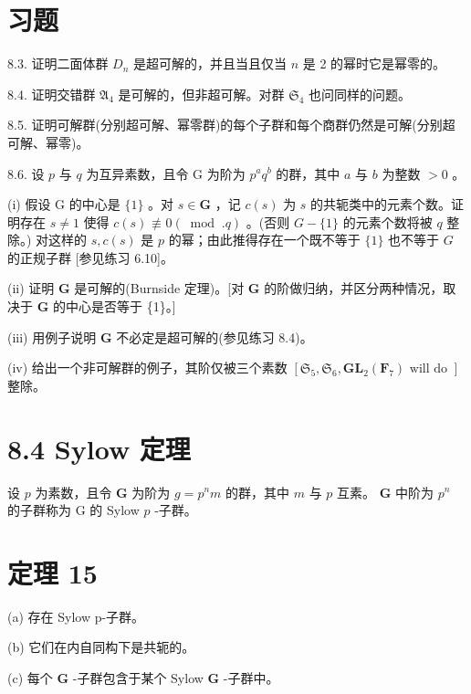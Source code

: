 \documentclass[10pt]{article}
\begin{document}
\section*{习题}

8.3. 证明二面体群 \({D}_{n}\) 是超可解的，并且当且仅当 \(n\) 是 2 的幂时它是幂零的。

8.4. 证明交错群 \({\mathfrak{A}}_{4}\) 是可解的，但非超可解。对群 \({\mathfrak{S}}_{4}\) 也问同样的问题。

8.5. 证明可解群(分别超可解、幂零群)的每个子群和每个商群仍然是可解(分别超可解、幂零)。

8.6. 设 \(p\) 与 \(q\) 为互异素数，且令 \(\mathrm{G}\) 为阶为 \({p}^{a}{q}^{b}\) 的群，其中 \(a\) 与 \(b\) 为整数 \(> 0\) 。

(i) 假设 \(\mathrm{G}\) 的中心是 \(\{ 1\}\) 。对 \(s \in  \mathbf{G}\) ，记 \(c\left( s\right)\) 为 \(s\) 的共轭类中的元素个数。证明存在 \(s \neq  1\) 使得 \(c\left( s\right)  \text{ ≢ } 0\left( {{\;\operatorname{mod}\;.}q}\right)\) 。(否则 \(G - \{ 1\}\) 的元素个数将被 \(q\) 整除。) 对这样的 \(s,c\left( s\right)\) 是 \(p\) 的幂；由此推得存在一个既不等于 \(\{ 1\}\) 也不等于 \(G\) 的正规子群 [参见练习 6.10]。

(ii) 证明 \(\mathbf{G}\) 是可解的(Burnside 定理)。[对 \(\mathbf{G}\) 的阶做归纳，并区分两种情况，取决于 \(\mathbf{G}\) 的中心是否等于 \{1\}。]

(iii) 用例子说明 \(\mathbf{G}\) 不必定是超可解的(参见练习 8.4)。

(iv) 给出一个非可解群的例子，其阶仅被三个素数 \(\left\lbrack  {{\mathfrak{S}}_{5},{\mathfrak{S}}_{6},{\mathbf{{GL}}}_{2}\left( {\mathbf{F}}_{7}\right) \text{ will do }}\right\rbrack\) 整除。

\section*{8.4 Sylow 定理}

设 \(p\) 为素数，且令 \(\mathbf{G}\) 为阶为 \(g = {p}^{n}m\) 的群，其中 \(m\) 与 \(p\) 互素。 \(\mathbf{G}\) 中阶为 \({p}^{n}\) 的子群称为 G 的 Sylow \(p\) -子群。

\section*{定理 15}

(a) 存在 Sylow p-子群。

(b) 它们在内自同构下是共轭的。

(c) 每个 \(\mathbf{G}\) -子群包含于某个 Sylow \(\mathbf{G}\) -子群中。
\end{document}
